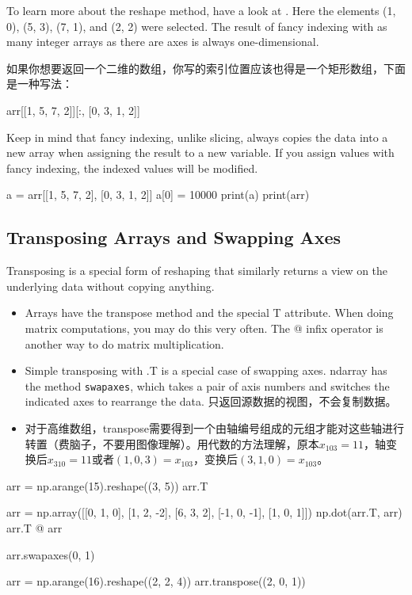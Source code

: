 To learn more about the reshape method, have a look at . Here the elements (1, 0), (5, 3), (7, 1), and (2, 2) were selected. The result of fancy indexing with as many integer arrays as there are axes is always one-dimensional.

如果你想要返回一个二维的数组，你写的索引位置应该也得是一个矩形数组，下面是一种写法：
\begin{pyc}
arr[[1, 5, 7, 2]][:, [0, 3, 1, 2]]
\end{pyc}

Keep in mind that fancy indexing, unlike slicing, always copies the data into a new array when assigning the result to a new variable. If you assign values with fancy indexing, the indexed values will be modified.

\begin{pyc}
a = arr[[1, 5, 7, 2], [0, 3, 1, 2]]
a[0] = 10000
print(a)
print(arr)
\end{pyc}
\subsection{Transposing Arrays and Swapping Axes}
Transposing is a special form of reshaping that similarly returns a view on the underlying data without copying anything.
\begin{itemize}
    \item Arrays have the transpose method and the special T attribute. When doing matrix computations, you may do this very often. The @ infix operator is another way to do matrix multiplication.
    \item Simple transposing with .T is a special case of swapping axes. ndarray has the method \verb|swapaxes|, which takes a pair of axis numbers and switches the indicated axes to rearrange the data. 只返回源数据的视图，不会复制数据。
    \item 对于高维数组，transpose需要得到一个由轴编号组成的元组才能对这些轴进行转置（费脑子，不要用图像理解）。用代数的方法理解，原本$x_{103}=11$，轴变换后$x_{310}=11$或者$(1, 0, 3)=x_{103}$，变换后$(3, 1, 0)=x_{103}$。
\end{itemize}
\begin{pyc}
arr = np.arange(15).reshape((3, 5))
arr.T

arr = np.array([[0, 1, 0], [1, 2, -2], [6, 3, 2], [-1, 0, -1], [1, 0, 1]])
np.dot(arr.T, arr)
arr.T @ arr

arr.swapaxes(0, 1)

arr = np.arange(16).reshape((2, 2, 4))
arr.transpose((2, 0, 1))
\end{pyc}
